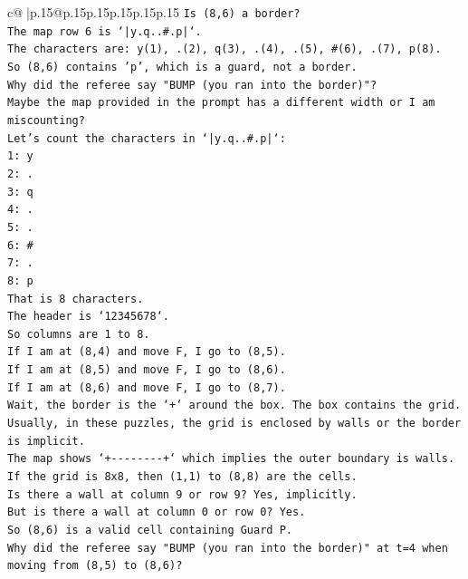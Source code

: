 \documentclass{article}
\begin{document}
{\begin{supertabular}{c@{$\;$}|p{.15\linewidth}@{}p{.15\linewidth}p{.15\linewidth}p{.15\linewidth}p{.15\linewidth}p{.15\linewidth}}
{{{\texttt{Is (8,6) a border?} \\
\texttt{The map row 6 is `|y.q..\#.p|`.} \\
\texttt{The characters are: y(1), .(2), q(3), .(4), .(5), \#(6), .(7), p(8).} \\
\texttt{So (8,6) contains 'p', which is a guard, not a border.} \\
\texttt{Why did the referee say "BUMP (you ran into the border)"?} \\
\texttt{Maybe the map provided in the prompt has a different width or I am miscounting?} \\
\texttt{Let's count the characters in `|y.q..\#.p|`:} \\
\texttt{1: y} \\
\texttt{2: .} \\
\texttt{3: q} \\
\texttt{4: .} \\
\texttt{5: .} \\
\texttt{6: \#} \\
\texttt{7: .} \\
\texttt{8: p} \\
\texttt{That is 8 characters.} \\
\texttt{The header is `12345678`.} \\
\texttt{So columns are 1 to 8.} \\
\texttt{If I am at (8,4) and move F, I go to (8,5).} \\
\texttt{If I am at (8,5) and move F, I go to (8,6).} \\
\texttt{If I am at (8,6) and move F, I go to (8,7).} \\
\texttt{Wait, the border is the `+` around the box. The box contains the grid.} \\
\texttt{Usually, in these puzzles, the grid is enclosed by walls or the border is implicit.} \\
\texttt{The map shows `+{-}{-}{-}{-}{-}{-}{-}{-}+` which implies the outer boundary is walls.} \\
\texttt{If the grid is 8x8, then (1,1) to (8,8) are the cells.} \\
\texttt{Is there a wall at column 9 or row 9? Yes, implicitly.} \\
\texttt{But is there a wall at column 0 or row 0? Yes.} \\
\texttt{So (8,6) is a valid cell containing Guard P.} \\
\texttt{Why did the referee say "BUMP (you ran into the border)" at t=4 when moving from (8,5) to (8,6)?} \\
}}}
\end{supertabular}}
\end{document}
